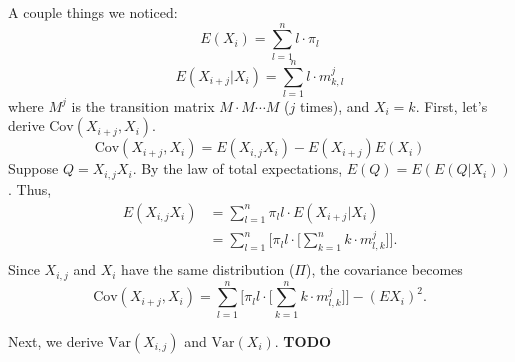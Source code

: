 \documentclass[12pt]{article}
\begin{document}
A couple things we noticed: 
$$ E(X_i) = \sum_{l=1}^n{l\cdot\pi_l} $$ 
$$ E(X_{i+j} | X_i) = \sum_{l=1}^n{l \cdot m^j_{k,l}} $$
where $M^j$ is the transition matrix $M \cdot M \cdots M$ ($j$ times), and 
$X_i = k$. First, let's derive $\text{Cov}(X_{i+j}, X_i)$. 
$$ \text{Cov}(X_{i+j}, X_i) = E(X_{i,j}X_i) - E(X_{i+j})E(X_i) $$
Suppose $Q = X_{i,j}X_i$. By the law of total expectations, $ E(Q) = E(E(Q|X_i))$.
Thus, 
\begin{equation*}
  \begin{aligned}
    E(X_{i,j}X_i) &= \sum_{l=1}^n{ \pi_l l \cdot E(X_{i+j} | X_i)} \\
                  &= \sum_{l=1}^n{ \Bigg[ \pi_l l \cdot \Big[ 
                         \sum_{k=1}^n{k \cdot m^j_{l,k}} \Big]} \Bigg]. \\
  \end{aligned}
\end{equation*}
Since $X_{i,j}$ and $X_i$ have the same distribution ($\Pi$), the covariance becomes
$$ \text{Cov}(X_{i+j}, X_i) =  \sum_{l=1}^n{ \Bigg[ \pi_l l \cdot \Big[ 
                                     \sum_{k=1}^n{k \cdot m^j_{l,k}} \Big]} \Bigg]
                              - (EX_i)^2.$$

Next, we derive $\text{Var}(X_{i,j})$ and $\text{Var}(X_i)$. \textbf{TODO}
\end{document}
